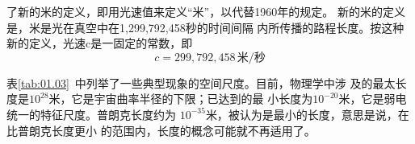 \noindent 了新的米的定义，即用光速值来定义“米”，以代替1960年的规定。
新的米的定义是，米是光在真空中在1,299,792,458秒的时间间隔
内所传播的路程长度。按这种新的定义，光速c是一固定的常数，即
\begin{equation*}
    c = 299,792,458 \, \text{米/秒}
\end{equation*}

表\ref{tab:01.03}~中列举了一些典型现象的空间尺度。目前，物理学中涉
及的最太长度是$10^{28}$米，它是宇宙曲率半径的下限；已达到的最
小长度为$10^{-20}$米，它是弱电统一的特征尺度。普朗克长度约为
$10^{-35}$米，被认为是最小的长度，意思是说，在比普朗克长度更小
的范围内，长度的概念可能就不再适用了。
